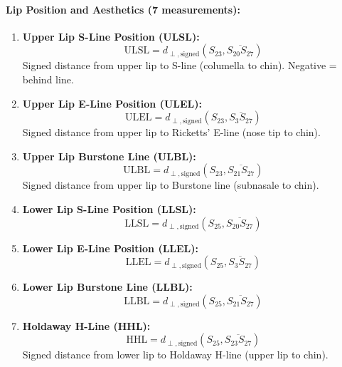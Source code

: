 \paragraph{Lip Position and Aesthetics (7 measurements):}
\begin{enumerate}[resume]
    \item \textbf{Upper Lip S-Line Position (ULSL):}
    \begin{equation}
    \text{ULSL} = d_{\perp,\text{signed}}(S_{23}, \overline{S_{20}S_{27}})
    \end{equation}
    Signed distance from upper lip to S-line (columella to chin). Negative = behind line.
    
    \item \textbf{Upper Lip E-Line Position (ULEL):}
    \begin{equation}
    \text{ULEL} = d_{\perp,\text{signed}}(S_{23}, \overline{S_3S_{27}})
    \end{equation}
    Signed distance from upper lip to Ricketts' E-line (nose tip to chin).
    
    \item \textbf{Upper Lip Burstone Line (ULBL):}
    \begin{equation}
    \text{ULBL} = d_{\perp,\text{signed}}(S_{23}, \overline{S_{21}S_{27}})
    \end{equation}
    Signed distance from upper lip to Burstone line (subnasale to chin).
    
    \item \textbf{Lower Lip S-Line Position (LLSL):}
    \begin{equation}
    \text{LLSL} = d_{\perp,\text{signed}}(S_{25}, \overline{S_{20}S_{27}})
    \end{equation}
    
    \item \textbf{Lower Lip E-Line Position (LLEL):}
    \begin{equation}
    \text{LLEL} = d_{\perp,\text{signed}}(S_{25}, \overline{S_3S_{27}})
    \end{equation}
    
    \item \textbf{Lower Lip Burstone Line (LLBL):}
    \begin{equation}
    \text{LLBL} = d_{\perp,\text{signed}}(S_{25}, \overline{S_{21}S_{27}})
    \end{equation}
    
    \item \textbf{Holdaway H-Line (HHL):}
    \begin{equation}
    \text{HHL} = d_{\perp,\text{signed}}(S_{25}, \overline{S_{23}S_{27}})
    \end{equation}
    Signed distance from lower lip to Holdaway H-line (upper lip to chin).
\end{enumerate}

